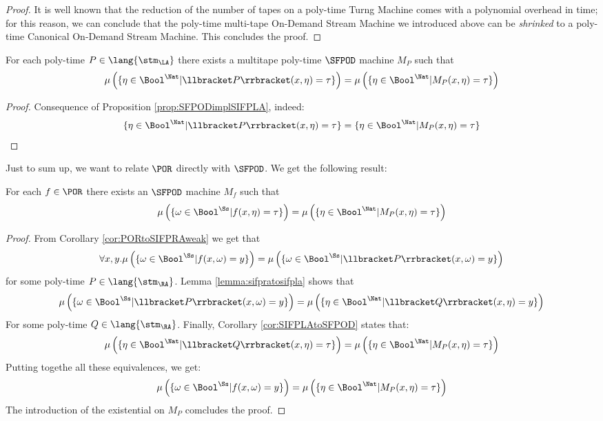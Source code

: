 \begin{proof}
It is well known that the reduction of the number of tapes on a poly-time Turng Machine
comes with a polynomial overhead in time; for this reason, we can conclude that
the poly-time multi-tape On-Demand Stream Machine we introduced above can be \emph{shrinked}
to a poly-time Canonical On-Demand Stream Machine. This concludes the proof.
\end{proof}

\begin{cor}
  \label{cor:SIFPLAtoSFPOD}
  For each poly-time $P\in \lang {\stm_\LA}$ there exists a multitape poly-time $\SFPOD$ machine $M_P$
  such that
  $$
  \mu\left(\{\eta \in \Bool^\Nat| \llbracket P\rrbracket (x, \eta)= \tau\}\right)
  =
    \mu\left(\{\eta \in \Bool^\Nat|  M_P(x, \eta)= \tau\}\right)
  $$
\end{cor}
\begin{proof}
  Consequence of Proposition \ref{prop:SFPODimplSIFPLA}, indeed:
  $$
\{\eta \in \Bool^\Nat| \llbracket P\rrbracket (x, \eta)= \tau\}
  =
    \{\eta \in \Bool^\Nat|  M_P(x, \eta)= \tau\}
  $$
\end{proof}

Just to sum up, we want to relate $\POR$ directly with $\SFPOD$.
We get the following result:

\begin{cor}
  For each $f\in \POR$ there exists an $\SFPOD$ machine $M_f$
  such that
  $$
  \mu\left(\{\omega \in \Bool^\Ss| f (x, \eta)= \tau\}\right)
  =
    \mu\left(\{\eta \in \Bool^\Nat| M_P(x, \eta)= \tau\}\right)
  $$
\end{cor}
\begin{proof}
  From Corollary \ref{cor:PORtoSIFPRAweak}
  we get that
  $$
  \forall x, y.
  \mu\left(\{\omega \in \Bool^\Ss| f(x, \omega)=y\}\right)=
  \mu\left(\{\omega \in \Bool^\Ss| \llbracket P\rrbracket (x, \omega)=y\}\right)
  $$
  for some poly-time $P \in \lang{\stm_\RA}$. Lemma \ref{lemma:sifpratosifpla}
  shows that
  $$
  \mu\left(\{\omega \in \Bool^\Ss| \llbracket P\rrbracket (x, \omega)= y\}\right)=
  \mu\left(\{\eta \in \Bool^\Nat| \llbracket Q \rrbracket(x, \eta)= y\}\right)
  $$
  For some poly-time $Q \in \lang{\stm_\RA}$. Finally, Corollary \ref{cor:SIFPLAtoSFPOD}
  states that:
  $$
  \mu\left(\{\eta \in \Bool^\Nat| \llbracket Q\rrbracket (x, \eta)= \tau\}\right)
  =
    \mu\left(\{\eta \in \Bool^\Nat|  M_P(x, \eta)= \tau\}\right)
  $$
  Putting togethe all these equivalences, we get:
  $$
    \mu\left(\{\omega \in \Bool^\Ss| f(x, \omega)=y\}\right)=\mu\left(\{\eta \in \Bool^\Nat|  M_P(x, \eta)= \tau\}\right)
  $$
  The introduction of the existential on $M_P$ comcludes the proof.

\end{proof}


























